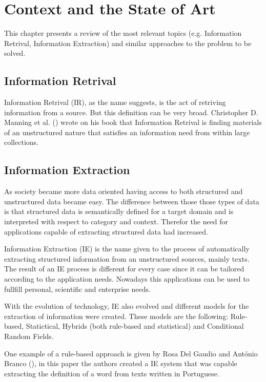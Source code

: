 
\chapter{Context and the State of Art}
\label{chap:Chapter2}

This chapter presents a review of the most relevant topics (e.g. Information Retrival, Information Extraction) and similar approaches to the problem to be solved.

\section{Information Retrival}


Information Retrival (IR), as the name suggests, is the act of retriving information from a source.
But this definition can be very broad.
Christopher D. Manning et al. (\citeyear{Reference1}) wrote on his book that Information Retrival is finding materials of an unstructured nature that satisfies an information need from within large collections.

\section{Information Extraction}

As society became more data oriented having access to both structured and unstructured data became easy.
The difference between those those types of data is that structured data is semantically defined for a target domain and is interpreted with respect to category and context.
Therefor the need for applications capable of extracting structured data had increased.

Information Extraction (IE) is the name given to the process of automatically extracting structured information from an unstructured sources, mainly texts.
The result of an IE process is different for every case since it can be tailored according to the application needs.
Nowadays this applications can be used to fullfill personal, scientific and enterprise needs.

With the evolution of technology, IE also evolved and different models for the extraction of information were created.
These models are the following: Rule-based, Statictical, Hybrids (both rule-based and statistical) and Conditional Random Fields.

One example of a rule-based approach is given by Rosa Del Gaudio and António Branco (\citeyear{Reference4}), in this paper the authors created a IE system that was capable extracting the definition of a word from texts written in Portuguese.

